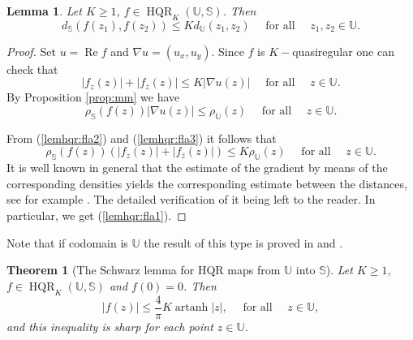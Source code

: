 \documentclass{amsart}
\newcommand{\re}{\mathop{\mathrm{Re}}}
\newcommand{\HQR}{\mathop{\mathrm{HQR}}}
\newcommand{\artanh}{\mathop{\mathrm{artanh}}}
\newtheorem{theorem}{Theorem}
\newtheorem{lemma}{Lemma}
\begin{document}
\begin{lemma}\label{lem:hqr}
Let $K\geqslant1$, $f\in\HQR_K(\mathbb{U},\mathbb{S})$. Then
\begin{equation}\label{lemhqr:fla1}
 d_{\mathbb{S}}(f(z_1),f(z_2))\leqslant Kd_{\mathbb{U}}(z_1,z_2) \quad  \mbox{ for all }\quad z_1,z_2\in\mathbb{U}.
\end{equation}
\end{lemma}
\begin{proof}
Set $u=\re{f}$ and $\nabla u=(u_x,u_y)$. Since $f$ is $K-$quasiregular one can check that
\begin{equation}\label{lemhqr:fla2}
     |f_z(z)|+|f_{\overline{z}}(z)|\leqslant K|\nabla u(z)| \quad \mbox{ for all } \quad z\in\mathbb{U}.
\end{equation}
By Proposition \ref{prop:mm} we have
\begin{equation}\label{lemhqr:fla3}
    \rho_{\mathbb{S}}(f(z))|\nabla u(z)|\leqslant \rho_{\mathbb{U}}(z)\quad \mbox{ for all }\quad z\in\mathbb{U}.
\end{equation}

From (\ref{lemhqr:fla2}) and (\ref{lemhqr:fla3}) it follows that
\begin{equation}\label{}
    \rho_{\mathbb{S}}(f(z))\left(|f_z(z)|+|f_{\overline{z}}(z)|\right)\leqslant K\rho_{\mathbb{U}}(z)\quad \mbox{ for all }\quad z\in\mathbb{U}.
\end{equation}
It is well known  in general   that  the estimate of the gradient by
means of the corresponding densities yields the corresponding  estimate
between the distances, see for example \cite{MMSchw_Kob}. The detailed verification of it  being left to the
reader. In particular, we get (\ref{lemhqr:fla1}).
\end{proof}

Note that if codomain is  $\mathbb{U}$   the result of this type is proved in \cite{MaK} and \cite{MKnez}.

\begin{theorem}[The Schwarz lemma for HQR maps from $\mathbb{U}$ into $\mathbb{S}$]\label{th:schwhqr}
Let $K\geqslant1$, $f\in\HQR_K(\mathbb{U},\mathbb{S})$ and $f(0)=0$. Then
\begin{equation}\label{schwhqr:fla}
    |f(z)|\leqslant\frac{4}{\pi}K\artanh{|z|}, \quad \mbox{ for all } \quad z\in\mathbb{U},
\end{equation}
and this inequality is sharp for each point $z\in\mathbb{U}$.
\end{theorem}
\end{document}
